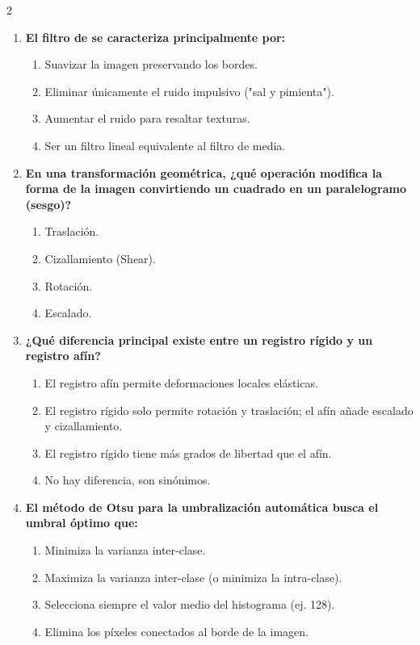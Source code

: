 \documentclass[a4paper,10pt]{extarticle}
\begin{document}
\begin{multicols*}{2}
\begin{enumerate}
    \item \textbf{El filtro de  se caracteriza principalmente por:}
    \begin{enumerate}[label=\alph*)]
        \item Suavizar la imagen preservando los bordes.
        \item Eliminar únicamente el ruido impulsivo ("sal y pimienta").
        \item Aumentar el ruido para resaltar texturas.
        \item Ser un filtro lineal equivalente al filtro de media.
    \end{enumerate}

    \item \textbf{En una transformación geométrica, ¿qué operación modifica la forma de la imagen convirtiendo un cuadrado en un paralelogramo (sesgo)?}
    \begin{enumerate}[label=\alph*)]
        \item Traslación.
        \item Cizallamiento (Shear).
        \item Rotación.
        \item Escalado.
    \end{enumerate}

    \item \textbf{¿Qué diferencia principal existe entre un registro rígido y un registro afín?}
    \begin{enumerate}[label=\alph*)]
        \item El registro afín permite deformaciones locales elásticas.
        \item El registro rígido solo permite rotación y traslación; el afín añade escalado y cizallamiento.
        \item El registro rígido tiene más grados de libertad que el afín.
        \item No hay diferencia, son sinónimos.
    \end{enumerate}

    \item \textbf{El método de Otsu para la umbralización automática busca el umbral óptimo que:}
    \begin{enumerate}[label=\alph*)]
        \item Minimiza la varianza inter-clase.
        \item Maximiza la varianza inter-clase (o minimiza la intra-clase).
        \item Selecciona siempre el valor medio del histograma (ej. 128).
        \item Elimina los píxeles conectados al borde de la imagen.
    \end{enumerate}


\end{enumerate}
\end{multicols*}
\end{document}
